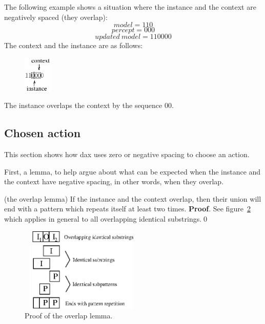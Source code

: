 The following example shows a situation where the instance and
the context are negatively spaced (they overlap):
$$
model = 110
$$
$$
percept = 000
$$
$$
updated\ model = 110000
$$
\hfill\break
The context and the instance are as follows:
\hfill\break
\begin{figure}[ht]
  \begin{center}
  \includegraphics[width=0.12\textwidth, keepaspectratio]
                                        {Eps/overlappingInstances1.eps}
  \end{center}
  \label{fig:overlappingInstances1}
\end{figure}
\hfill\break
The instance overlaps the context by the sequence $00$.

\subsection{Chosen action}
This section shows how dax uses zero or negative spacing to choose an
action.

First, a lemma, to help argue about what can be expected when the
instance and the context have negative spacing, in other words, when they
overlap.
\begin{lemma}
(the overlap lemma)\hfill\break
If the instance and the context overlap, then their union will end with
a pattern which repeats itself at least two times.\hfill\break
{\bf Proof}.\hfill\break
See figure~\ref{fig:overlappingInstances3} which applies in general to all
overlapping identical substrings.\hfill \qed
\end{lemma}
\begin{figure}[ht]
  \begin{center}
  \includegraphics[width=6cm,height=4cm]{Eps/overlappingInstances3.eps}
  \end{center}
  \caption{Proof of the overlap lemma.}
  \label{fig:overlappingInstances3}
\end{figure}

